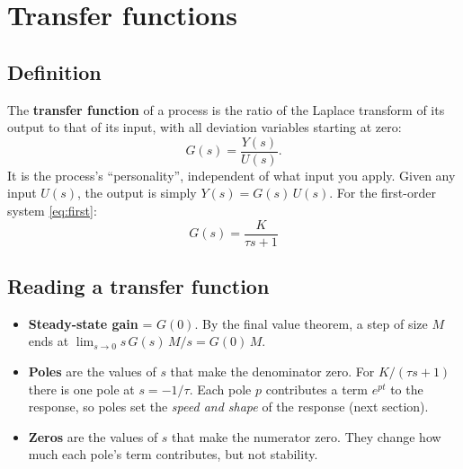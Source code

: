 \documentclass[11pt,a4paper]{article}
\begin{document}
\section{Transfer functions}

\subsection{Definition}
The \textbf{transfer function} of a process is the ratio of the Laplace transform of its output to that of
its input, with all deviation variables starting at zero:
\begin{equation}
  G(s) = \frac{Y(s)}{U(s)} .
\end{equation}
It is the process's ``personality'', independent of what input you apply. Given any input $U(s)$, the
output is simply $Y(s) = G(s)\,U(s)$. For the first-order system \eqref{eq:first}:
\begin{equation}
  \boxed{\,G(s) = \frac{K}{\tau s + 1}\,}
\end{equation}

\subsection{Reading a transfer function}
\begin{itemize}
  \item \textbf{Steady-state gain} = $G(0)$. By the final value theorem, a step of size $M$ ends at
    $\lim_{s\to0} s\,G(s)\,M/s = G(0)\,M$.
  \item \textbf{Poles} are the values of $s$ that make the denominator zero. For $K/(\tau s+1)$ there is one
    pole at $s = -1/\tau$. Each pole $p$ contributes a term $e^{pt}$ to the response, so poles set the
    \emph{speed and shape} of the response (next section).
  \item \textbf{Zeros} are the values of $s$ that make the numerator zero. They change how much each pole's
    term contributes, but not stability.
\end{itemize}
\end{document}
